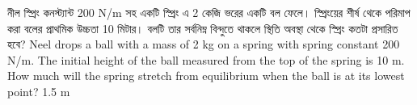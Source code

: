 \documentclass[article, 12pt, a4paper, onesize]{memoir}
\begin{document}
\begin{Problems}
    \problem
    {নীল স্প্রিং কনস্ট্যান্ট 200 N/m সহ একটি স্প্রিং এ 2 কেজি ভরের একটি বল ফেলে। স্প্রিংয়ের শীর্ষ থেকে পরিমাপ করা বলের প্রাথমিক উচ্চতা 10 মিটার। বলটি তার সর্বনিম্ন বিন্দুতে থাকলে স্থিতি অবস্থা থেকে স্প্রিং কতটা প্রসারিত হবে?}
    {Neel drops a ball with a mass of 2 kg on a spring with spring constant 200 N/m. The initial height of the ball measured from the top of the spring is 10 m. How much will the spring stretch from equilibrium when the ball is at its lowest point?}
    {}
    {1.5 m}



\end{Problems}
\end{document}

